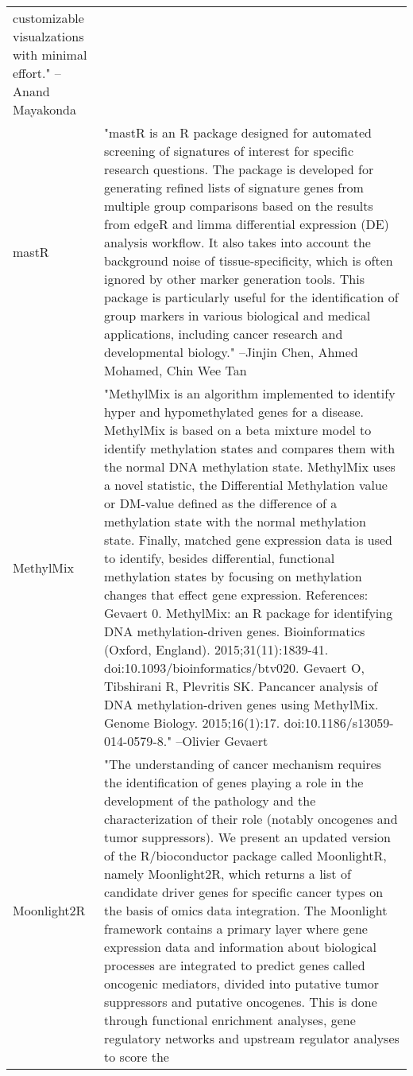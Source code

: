 \begin{longtable}[t]{l>{\raggedright\arraybackslash}p{25em}}
customizable visualzations with minimal effort." --Anand Mayakonda\\
mastR & "mastR is an R package designed for automated screening of
signatures of interest for specific research questions. The
package is developed for generating refined lists of signature
genes from multiple group comparisons based on the results from
edgeR and limma differential expression (DE) analysis workflow.
It also takes into account the background noise of
tissue-specificity, which is often ignored by other marker
generation tools. This package is particularly useful for the
identification of group markers in various biological and
medical applications, including cancer research and
developmental biology." --Jinjin Chen, Ahmed Mohamed, Chin Wee Tan\\
MethylMix & "MethylMix is an algorithm implemented to identify hyper
and hypomethylated genes for a disease. MethylMix is based on a
beta mixture model to identify methylation states and compares
them with the normal DNA methylation state. MethylMix uses a
novel statistic, the Differential Methylation value or DM-value
defined as the difference of a methylation state with the
normal methylation state. Finally, matched gene expression data
is used to identify, besides differential, functional
methylation states by focusing on methylation changes that
effect gene expression. References: Gevaert 0. MethylMix: an R
package for identifying DNA methylation-driven genes.
Bioinformatics (Oxford, England). 2015;31(11):1839-41.
doi:10.1093/bioinformatics/btv020. Gevaert O, Tibshirani R,
Plevritis SK. Pancancer analysis of DNA methylation-driven
genes using MethylMix. Genome Biology. 2015;16(1):17.
doi:10.1186/s13059-014-0579-8." --Olivier Gevaert\\
\addlinespace
Moonlight2R & "The understanding of cancer mechanism requires the
identification of genes playing a role in the development of
the pathology and the characterization of their role (notably
oncogenes and tumor suppressors). We present an updated version
of the R/bioconductor package called MoonlightR, namely
Moonlight2R, which returns a list of candidate driver genes for
specific cancer types on the basis of omics data integration.
The Moonlight framework contains a primary layer where gene
expression data and information about biological processes are
integrated to predict genes called oncogenic mediators, divided
into putative tumor suppressors and putative oncogenes. This is
done through functional enrichment analyses, gene regulatory
networks and upstream regulator analyses to score the

\end{longtable}
